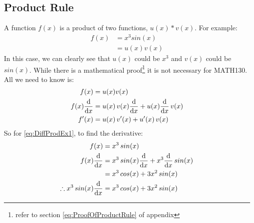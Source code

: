 \subsection{Product Rule}
\label{sec:ProductRule}
A function $f(x)$ is a product of two functions, $u(x) * v(x)$. For example:
\begin{align}
  f(x) & = {x}^{3} sin(x) \label{eq:DiffProdEx1}\\
       & = u(x)v(x)
\end{align}
In this case, we can clearly see that $u(x)$ could be ${x}^{3}$ and $v(x)$
could be $sin(x)$. While there is a mathematical proof\footnote{refer to section
\ref{eq:ProofOfProductRule} of appendix} it is not necessary for MATH130.
All we need to know is:
\begin{align}
             f(x) & = u(x)v(x) \\
  f(x)\frac{\mathrm{d}}{\mathrm{d}x} & = u(x)\,v(x)\frac{\mathrm{d}}{\mathrm{d}x} + u(x)\frac{\mathrm{d}}{\mathrm{d}x}\,v(x) \\
            f'(x) & = u(x)\,v'(x) + u'(x)\,v(x)
\end{align}
So for \ref{eq:DiffProdEx1}, to find the derivative:
\begin{align}
            f(x)  & = {x}^{3}\,sin(x) \nonumber \\
  f(x)\frac{\mathrm{d}}{\mathrm{d}x} & = {x}^{3}\,sin(x)\frac{\mathrm{d}}{\mathrm{d}x} + {x}^{3}\frac{\mathrm{d}}{\mathrm{d}x}\,sin(x) \\
                  & = {x}^{3}\,cos(x) + 3{x}^{2}\,sin(x) \\
  \therefore {x}^{3}\,sin(x)\frac{\mathrm{d}}{\mathrm{d}x}  & = {x}^{3}\,cos(x) + 3{x}^{2}\,sin(x)
\end{align}
